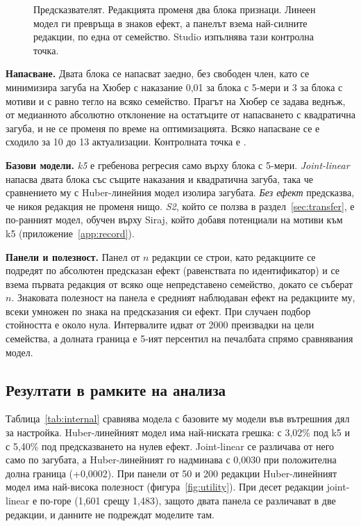 \documentclass[10.5pt,a4paper]{article}
\begin{document}
\begin{figure}[htb]
\centering
{}
\caption{Предсказвателят. Редакцията променя два блока признаци. Линеен модел ги превръща в знаков ефект, а панелът взема най-силните редакции, по една от семейство. Studio изпълнява тази контролна точка.}\label{fig:pipeline}
\end{figure}

\textbf{Напасване.} Двата блока се напасват заедно, без свободен член, като се минимизира загуба на Хюбер \citep{huber1964} с наказание 0,01 за блока с 5-мери и 3 за блока с мотиви и с равно тегло на всяко семейство. Прагът на Хюбер се задава веднъж, от медианното абсолютно отклонение на остатъците от напасването с квадратична загуба, и не се променя по време на оптимизацията. Всяко напасване се е сходило за 10 до 13 актуализации. Контролната точка е .

\textbf{Базови модели.} \emph{k5} е гребенова регресия само върху блока с 5-мери. \emph{Joint-linear} напасва двата блока със същите наказания и квадратична загуба, така че сравнението му с Huber-линейния модел изолира загубата. \emph{Без ефект} предсказва, че никоя редакция не променя нищо. \emph{S2}, който се ползва в раздел~\ref{sec:transfer}, е по-ранният модел, обучен върху Siraj, който добавя потенциали на мотиви към k5 (приложение~\ref{app:record}).

\textbf{Панели и полезност.} Панел от $n$ редакции се строи, като редакциите се подредят по абсолютен предсказан ефект (равенствата по идентификатор) и се взема първата редакция от всяко още непредставено семейство, докато се съберат $n$. Знаковата полезност на панела е средният наблюдаван ефект на редакциите му, всеки умножен по знака на предсказания си ефект. При случаен подбор стойността е около нула. Интервалите идват от 2000 преизвадки на цели семейства, а долната граница е 5-ият персентил на печалбата спрямо сравнявания модел.

\subsection{Резултати в рамките на анализа}\label{sec:internal}

Таблица~\ref{tab:internal} сравнява модела с базовите му модели във вътрешния дял за настройка. Huber-линейният модел има най-ниската грешка: с 3,02\% под k5 и с 5,40\% под предсказването на нулев ефект. Joint-linear се различава от него само по загубата, а Huber-линейният го надминава с 0,0030 при положителна долна граница (+0,0002). При панели от 50 и 200 редакции Huber-линейният модел има най-висока полезност (фигура~\ref{fig:utility}). При десет редакции joint-linear е по-горе (1,601 срещу 1,483), защото двата панела се различават в две редакции, и данните не подреждат моделите там.
\end{document}
